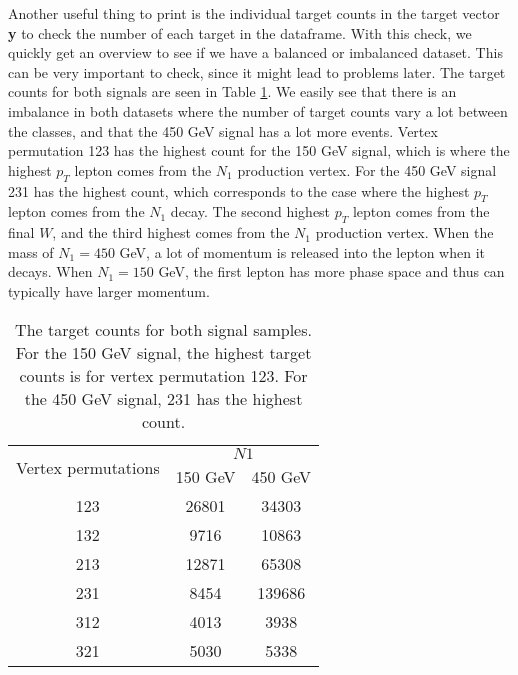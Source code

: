 \documentclass[a4paper, american, 12pt]{report}
\begin{document}
	Another useful thing to print is the individual target counts in the target vector \textbf{y} to check the number of each target in the dataframe. With this check, we quickly get an overview to see if we have a balanced or imbalanced dataset. This can be very important to check, since it might lead to problems later. The target counts for both signals are seen in Table \ref{tab:Counts_original}. We easily see that there is an imbalance in both datasets where the number of target counts vary a lot between the classes, and that the 450 GeV signal has a lot more events. Vertex permutation 123 has the highest count for the 150 GeV signal, which is where the highest $p_T$ lepton comes from the $N_1$ production vertex. For the 450 GeV signal 231 has the highest count, which corresponds to the case where the highest $p_T$ lepton comes from the $N_1$ decay. The second highest $p_T$ lepton comes from the final $W$, and the third highest comes from the $N_1$ production vertex. When the mass of $N_1= 450$ GeV, a lot of momentum is released into the lepton when it decays. When $N_1=150$ GeV, the first lepton has more phase space and thus can typically have larger momentum.
	\begin{table}[ht!]
		\centering
		\begin{tabular}{ |c|c|c| }
			\hline
			\multirow{2}{*}{Vertex permutations} & \multicolumn{2}{|c|}{$N1$}\\
			\cline{2-3} \rule{0pt}{13pt}
			 & 150 GeV & 450 GeV  \\
			\hline \rule{0pt}{13pt}
			123 & 26801 & 34303 \\
			\hline \rule{0pt}{13pt}
			132 & 9716 & 10863 \\
			\hline \rule{0pt}{13pt}
			213 & 12871 & 65308 \\
			\hline \rule{0pt}{13pt}
			231 & 8454 & 139686 \\
			\hline \rule{0pt}{13pt}
			312 & 4013 & 3938 \\
			\hline \rule{0pt}{13pt}
			321 & 5030 & 5338 \\
			\hline
		\end{tabular}	
		\caption[Target counts of the classes.]{The target counts for both signal samples. For the 150 GeV signal, the highest target counts is for vertex permutation 123. For the 450 GeV signal, 231 has the highest count.}
		\label{tab:Counts_original}
	\end{table}
	
	
\end{document}
